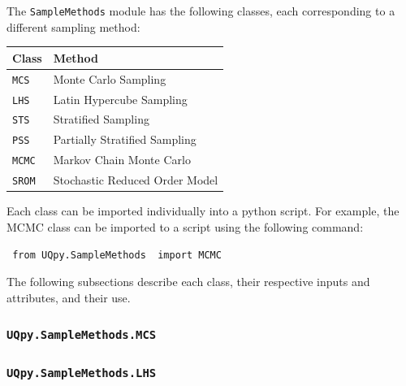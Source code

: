 \noindent
The \texttt{SampleMethods} module has the following classes, each corresponding to a different sampling method:

\vspace{4mm}
\begin{center}
	\begin{tabular}{ |l|l| } 
		\hline
		\textbf{Class} &  \textbf{Method} \\
		\hline
		\texttt{MCS}&  Monte Carlo Sampling  \\ 
		\hline
		\texttt{LHS}&  Latin Hypercube Sampling  \\ 
		\hline
		\texttt{STS}&  Stratified Sampling  \\ 
		\hline
		\texttt{PSS}&  Partially Stratified Sampling  \\ 
		\hline
		\texttt{MCMC}&  Markov Chain Monte Carlo  \\ 
		\hline
		\texttt{SROM}&  Stochastic Reduced Order Model  \\ 
		\hline
	\end{tabular}
\end{center}
\vspace{4mm}

\noindent
Each class can be imported individually into a python script. For example, the MCMC class can be imported to a script using the following command:

\vspace{4mm}
\texttt{{\color{blue} from} \texttt{UQpy.SampleMethods} {\color{blue} import} MCMC}
\vspace{4mm}

\noindent
The following subsections describe each class, their respective inputs and attributes, and their use.


\subsubsection{\texttt{UQpy.SampleMethods.MCS}}


\subsubsection{\texttt{UQpy.SampleMethods.LHS}}

